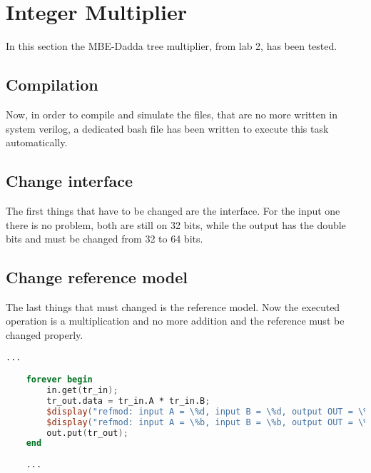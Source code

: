 %
\chapter{Integer Multiplier}
\label{cha3}

In this section the MBE-Dadda tree multiplier, from lab 2, has been tested.

\section{Compilation}
Now, in order to compile and simulate the files, that are no more written in system verilog, a dedicated 
bash file has been written to execute this task automatically.



\section{Change interface}

The first things that have to be changed are the interface. For the input one there is no problem,
both are still on 32 bits, while the output has the double bits and must be changed from 32 to 64 bits.



\section{Change reference model}

The last things that must changed is the reference model. Now the executed operation is a multiplication and 
no more addition and the reference must be changed properly.

\begin{lstlisting}[language=Verilog, caption=Inside refmode.sv]
    ... 

    forever begin
        in.get(tr_in);
        tr_out.data = tr_in.A * tr_in.B;
        $display("refmod: input A = \%d, input B = \%d, output OUT = \%d",tr_in.A, tr_in.B, tr_out.data);
        $display("refmod: input A = \%b, input B = \%b, output OUT = \%b",tr_in.A, tr_in.B, tr_out.data);
        out.put(tr_out);
    end
    
    ...
\end{lstlisting}





